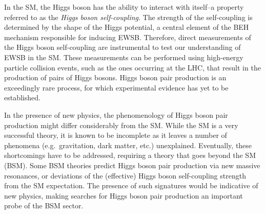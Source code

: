 
In the SM, the Higgs boson has the ability to interact with itself--a property
referred to as the \emph{Higgs boson self-coupling}. The strength of the
self-coupling is determined by the shape of the Higgs potential, a central
element of the BEH mechanism responsible for inducing EWSB.
Therefore, direct measurements of the Higgs boson self-coupling are instrumental
to test our understanding of EWSB in the SM. These measurements can be performed
using high-energy particle collision events, such as the ones occurring at the
LHC, that result in the production of pairs of Higgs bosons. Higgs boson pair
production is an exceedingly rare process, for which experimental evidence has
yet to be established.

In the presence of new physics, the phenomenology of Higgs boson pair production
might differ considerably from the SM. While the SM is a very successful theory,
it is known to be incomplete as it leaves a number of phenomena (e.g.\
gravitation, dark matter, etc.) unexplained. Eventually, these shortcomings have
to be addressed, requiring a theory that goes beyond the SM (BSM). Some BSM
theories predict Higgs boson pair production via new massive resonances, or
deviations of the (effective) Higgs boson self-coupling strength from the SM
expectation. The presence of such signatures would be indicative of new physics,
making searches for Higgs boson pair production an important probe of the BSM
sector.


